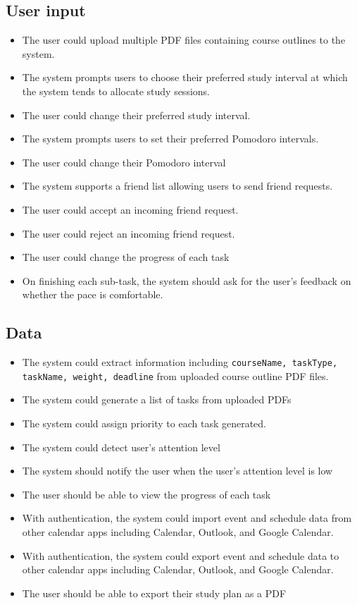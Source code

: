 \documentclass[12pt]{article}
\newcounter{reqnum} %
\newcommand{\rthereqnum}{FR\refstepcounter{reqnum}\thereqnum:}
\begin{document}
\subsection{User input}
\begin{itemize}
\item[\rthereqnum \label{R_upload_pdf}]
The user could upload multiple PDF files containing course outlines to the system.
\item[\rthereqnum]
The system prompts users to choose their preferred study interval at which the system tends to allocate study sessions.
\item[\rthereqnum]
The user could change their preferred study interval.
\item[\rthereqnum]
The system prompts users to set their preferred Pomodoro intervals. 
\item[\rthereqnum]
The user could change their Pomodoro interval
\item[\rthereqnum]
The system supports a friend list allowing users to send friend requests.
\item[\rthereqnum]
The user could accept an incoming friend request.
\item[\rthereqnum]
The user could reject an incoming friend request.
\item[\rthereqnum]
The user could change the progress of each task
\item[\rthereqnum]
On finishing each sub-task, the system should ask for the user's feedback on whether the pace is comfortable.
\end{itemize}

\subsection{Data}
\begin{itemize}
\item[\rthereqnum \label{R_prioritize_task}]
The system could extract information including \texttt{courseName, taskType, taskName, weight, deadline} from uploaded course outline PDF files.
\item[\rthereqnum]
The system could generate a list of tasks from uploaded PDFs 
\item[\rthereqnum]
The system could assign priority to each task generated.
\item[\rthereqnum]
The system could detect user's attention level
\item[\rthereqnum]
The system should notify the user when the user's attention level is low
\item[\rthereqnum \label{R_check_task_progress}]
The user should be able to view the progress of each task
\item[\rthereqnum]
With authentication, the system could import event and schedule data from other calendar apps including Calendar, Outlook, and Google Calendar.
\item[\rthereqnum]
With authentication, the system could export event and schedule data to other calendar apps including Calendar, Outlook, and Google Calendar.
\item[\rthereqnum]
The user should be able to export their study plan as a PDF
\end{itemize}
\end{document}
